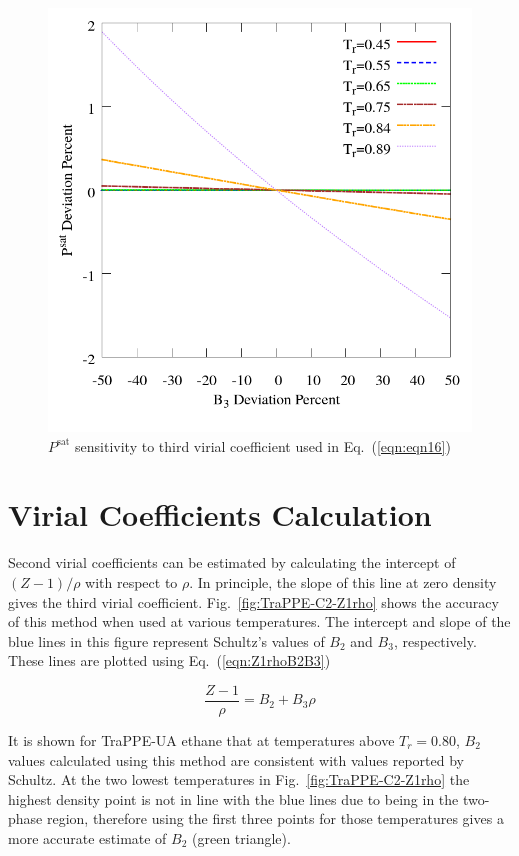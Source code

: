 \documentclass[%
 aip,
 jcp,
 sd,%
 amsmath,amssymb,
 reprint,%
]{revtex4-1}
\begin{document}
\begin{figure}
\includegraphics[scale=0.3]{Figures/FTT-B3xX-C12-Psat.png}
\caption{$P^{\mathrm{sat}}$ sensitivity to third virial coefficient used in Eq.~(\ref{eqn:eqn16})}
\label{fig:FTT-B3xX-C12-Psat}
\end{figure}


\section{Virial Coefficients Calculation} \label{sec:VirialCalc}
Second virial coefficients can be estimated by calculating the intercept of $(Z-1)/\rho$ with respect to $\rho$. In principle, the slope of this line at zero density gives the third virial coefficient. Fig.~\ref{fig:TraPPE-C2-Z1rho} shows the accuracy of this method when used at various temperatures. The intercept and slope of the blue lines in this figure represent Schultz's \cite{Schultz2010a} values of $B_2$ and $B_3$, respectively. These lines are plotted using Eq.~(\ref{eqn:Z1rhoB2B3})

\begin{equation}
\frac{Z-1}{\rho} = B_2 + B_3\rho \label{eqn:Z1rhoB2B3}
\end{equation}

It is shown for TraPPE-UA ethane that at temperatures above $T_r=0.80$, $B_2$ values calculated using this method are consistent with values reported by Schultz. At the two lowest temperatures in Fig.~\ref{fig:TraPPE-C2-Z1rho} the highest density point is not in line with the blue lines due to being in the two-phase region, therefore using the first three points for those temperatures gives a more accurate estimate of $B_2$ (green triangle).  
\end{document}

